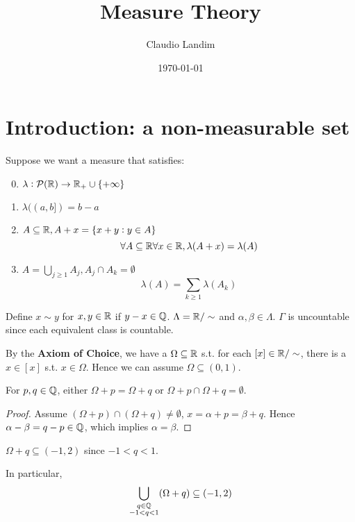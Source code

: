 \documentclass[11pt]{article}
\author{Claudio Landim}
\date{\today}
\title{Measure Theory}
\begin{document}
\maketitle
\tableofcontents \clearpage
\section{Introduction: a non-measurable set}
\label{sec:org57c4ac1}
Suppose we want a measure that satisfies:
\begin{enumerate}
\setcounter{enumi}{-1}
\item \(\lambda:\mathcal{P}(\mathbb{R})\to\mathbb{R}_+\cup\{+\infty\}\)
\item \(\lambda((a,b])=b-a\)
\item \(A\subseteq\mathbb{R},A+x=\{x+y:y\in A\}\)
\begin{equation*}
\forall A\subseteq\mathbb{R}\forall x\in\mathbb{R},\lambda(A+x)=\lambda(A)
\end{equation*}
\item \(A=\bigcup_{j\ge 1}A_j,A_j\cap A_k=\emptyset\)
\begin{equation*}
\lambda(A)=\displaystyle\sum_{k\ge1}\lambda(A_k)
\end{equation*}
\end{enumerate}



Define \(x\sim y\) for \(x,y\in\mathbb{R}\) if \(y-x\in\mathbb{Q}\). \(\Lambda=\mathbb{R}/\sim\) and
\(\alpha,\beta\in\Lambda\). \(\Gamma\) is uncountable since each equivalent class
is countable.

By the \textbf{Axiom of Choice}, we have a \(\Omega\subseteq\mathbb{R}\) s.t. for each
\([x]\in\mathbb{R}/\sim\), there is a \(x\in[x]\) s.t. \(x\in\Omega\). Hence we can assume
\(\Omega\subseteq(0,1)\). 

\begin{claim}
For \(p,q\in\mathbb{Q}\), either \(\Omega+p=\Omega+q\) or
\(\Omega+p\cap\Omega+q=\emptyset\).
\end{claim}

\begin{proof}
Assume \((\Omega+p)\cap(\Omega+q)\neq\emptyset\), \(x=\alpha+p=\beta+q\). Hence
\(\alpha-\beta=q-p\in\mathbb{Q}\), which implies \(\alpha=\beta\).
\end{proof}

\begin{claim}
\(\Omega+q\subseteq(-1,2)\) since \(-1<q<1\).
\end{claim}

In particular,
\begin{equation*}
\displaystyle\bigcup_{\substack{q\in\mathbb{Q}\\-1<q<1}}(\Omega+q)\subseteq(-1,2)
\end{equation*}
\end{document}

